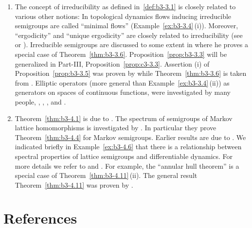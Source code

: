 \begin{enumerate}[label=\emph{Section \arabic*:}, wide]
\item
The concept of irreducibility as defined in~\ref{def:b3-3.1} is closely related to various other notions:
In topological dynamics flows inducing irreducible semigroups are called \enquote{minimal flows} (\cf Example~\ref{ex:b3-3.4}\,(i)).
Moreover, \enquote{ergodicity} and \enquote{unique ergodicity} are closely related to irreducibility (see \textcite{cornfeldetal:1982} or \textcite{krengel:1985}).
Irreducible semigroups are discussed to some extent in \textcite{davies:1980} where he proves a special case of Theorem~\ref{thm:b3-3.6}.
Proposition~\ref{prop:b3-3.3} will be generalized in Part-III, Proposition~\ref{prop:c3-3.3}.
Assertion (i) of Proposition~\ref{prop:b3-3.5} was proven by \textcite{schaefer:1982} while Theorem~\ref{thm:b3-3.6} is taken from \textcite{greiner:1982}.
Elliptic operators (more general than Example~\ref{ex:b3-3.4}\,(ii)) as generators on spaces of continuous functions, were investigated by many people, \eg \textcite{bonyetal:1968}, \textcite{kuhn:1984}, \textcite{roth:1976}, \textcite{roth:1978} and \textcite{stewart:1974}.

\item
Theorem~\ref{thm:b3-4.1} is due to \textcite{derndinger:1984}.
The spectrum of semigroups of Markov lattice homomorphisms is investigated by \textcite{derndingernagel:1979}.
In particular they prove Theorem~\ref{thm:b3-4.4} for Markov semigroups.
Earlier results are due to \textcite{scarpellini:1974}.
We indicated briefly in Example~\ref{ex:b3-4.6} that there is a relationship between spectral properties of lattice semigroups and differentiable dynamics.
For more details we refer to \textcite{chiconeswanson:1981} and \textcite{sackersell:1978}.
For example, the \enquote{annular hull theorem} is a special case of Theorem~\ref{thm:b3-4.11}\,(ii).
The general result Theorem~\ref{thm:b3-4.11} was proven by \textcite{arendtgreiner:1984}.

\end{enumerate}
\section*{References}
{\RaggedRight
  \printbibliography[heading=none]
 }
 
 